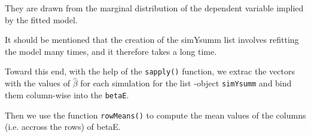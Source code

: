 \documentclass[a4paper,12pt]{article}
\begin{document}
They are drawn from the marginal distribution of the dependent variable implied by the fitted model.



It should be mentioned that the creation of the simYsumm list involves refitting the model many times, and it therefore takes a long time.

Toward this end, with the help of the \texttt{sapply()} function, we extrac the vectors with the values of $\hat{\beta}$ for each simulation for the list
-object \texttt{simYsumm} and bind them column-wise into the \texttt{betaE}.

Then we use the function \texttt{rowMeans()} to compute the mean values of the columns (i.e. accross the rows) of betaE.



\end{document}
